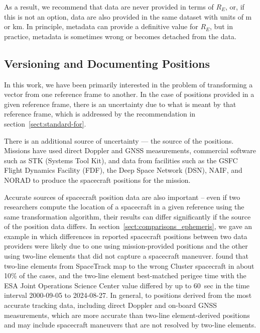 \documentclass[draft]{agujournal2019}
\begin{document}
As a result, we recommend that data are never provided in terms of $R_E$, or, if this is not an option, data are also provided in the same dataset with units of m or km. In principle, metadata can provide a definitive value for $R_E$, but in practice, metadata is sometimes wrong or becomes detached from the data.

\subsection{Versioning and Documenting Positions}
\label{sect:ephemeris-version}

In this work, we have been primarily interested in the problem of transforming a vector from one reference frame to another. In the case of positions provided in a given reference frame, there is an uncertainty due to what is meant by that reference frame, which is addressed by the recommendation in section~\ref{sect:standard-for}. 

There is an additional source of uncertainty --- the source of the positions. Missions have used direct Doppler and GNSS measurements,  commercial software such as STK (Systems Tool Kit), and data from facilities such as the GSFC Flight Dynamics Facility (FDF), the Deep Space Network (DSN), NAIF, and NORAD to produce the spacecraft positions for the mission.

Accurate sources of spacecraft position data are also important -- even if two researchers compute the location of a spacecraft in a given reference using the same transformation algorithm, their results can differ significantly if the source of the position data differs. In section~\ref{sect:comparisons_ephemeris}, we gave an example in which differences in reported spacecraft positions between two data providers were likely due to one using mission-provided positions and the other using two-line elements that did not capture a spacecraft maneuver.  found that two-line elements from SpaceTrack map to the wrong Cluster spacecraft in about 10\% of the cases, and the two-line element best-matched perigee time with the ESA Joint Operations Science Center value differed by up to 60~sec in the time interval 2000-09-05 to 2024-08-27. In general,  to positions derived from the most accurate tracking data, including direct Doppler and on-board GNSS measurements, which are more accurate than two-line element-derived positions and may include spacecraft maneuvers that are not resolved by two-line elements.
\end{document}
